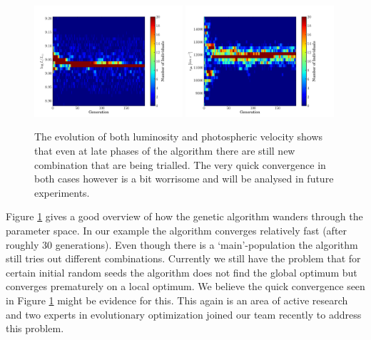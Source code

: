 \begin{figure}[tb] %
   \centering
   \includegraphics[width=0.49\textwidth]{chapter_dalek/plots/plot_02bo_lum_evol.pdf} 
   \includegraphics[width=0.49\textwidth]{chapter_dalek/plots/plot_02bo_vph_evol.pdf} 
   \caption[Evolution of both luminosity and photospheric velocity over generations]{The evolution of both luminosity and photospheric velocity shows that even at late phases of the algorithm there are still new combination that are being trialled. The very quick convergence in both cases however is a bit worrisome and will be analysed in future experiments.}
   \label{fig:lumvph_evolution}
\end{figure}


Figure \ref{fig:lumvph_evolution} gives a good overview of how the genetic algorithm wanders through the parameter space. In our example the algorithm converges relatively fast (after roughly 30 generations). Even though there is a `main'-population the algorithm still tries out different combinations. Currently we still have the problem that for certain initial random seeds the algorithm does not find the global optimum but converges prematurely on a local optimum. We believe the quick convergence seen in Figure \ref{fig:lumvph_evolution} might be evidence for this. This again is an area of active research and two experts in evolutionary optimization joined our team recently to address this problem. 


